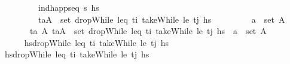\begin{isabellebody}
\ \ \ \ \ \ \ \ \ {\isachardoublequoteopen}ind{\isacharunderscore}{\kern0pt}happ{\isacharunderscore}{\kern0pt}seq\ {\isasympi}s\ hs\isanewline
\ \ \ \ \ \ \ \ \ {\isachardoublequoteopen}{\isacharparenleft}{\kern0pt}t\isactrlsub a{\isacharcomma}{\kern0pt}A{\isacharparenright}{\kern0pt}\ {\isasymin}\ set\ {\isacharparenleft}{\kern0pt}dropWhile\ {\isacharparenleft}{\kern0pt}leq\ t\isactrlsub i{\isacharparenright}{\kern0pt}\ {\isacharparenleft}{\kern0pt}takeWhile\ {\isacharparenleft}{\kern0pt}le\ t\isactrlsub j{\isacharparenright}{\kern0pt}\ hs\isanewline
\ \ \ \ \ \ \ \ \ {\isachardoublequoteopen}a\ {\isasymin}\ set\ A{\isachardoublequoteclose}\isanewline
\ \ \ \ \ \ \ {\isachardoublequoteopen}{\isasymexists}t\isactrlsub a{\isacharprime}{\kern0pt}\ A{\isacharprime}{\kern0pt}{\isachardot}{\kern0pt}\ {\isacharparenleft}{\kern0pt}t\isactrlsub a{\isacharprime}{\kern0pt}{\isacharcomma}{\kern0pt}A{\isacharprime}{\kern0pt}{\isacharparenright}{\kern0pt}\ {\isasymin}\ set\ {\isacharparenleft}{\kern0pt}dropWhile\ {\isacharparenleft}{\kern0pt}leq\ t\isactrlsub i{\isacharparenright}{\kern0pt}\ {\isacharparenleft}{\kern0pt}takeWhile\ {\isacharparenleft}{\kern0pt}le\ t\isactrlsub j{\isacharparenright}{\kern0pt}\ hs\ {\isasymand}\ a\ {\isasymin}\ set\ A{\isacharprime}{\kern0pt}{\isachardoublequoteclose}\isanewline
%
\isadelimproof
\ \ %
\endisadelimproof
%
\isatagproof
{}\isamarkupfalse%
\ {\isacharminus}{\kern0pt}\isanewline
\ \ \ \ \isamarkupfalse%
\ {\isacharquery}{\kern0pt}hsdropWhile\ {\isacharparenleft}{\kern0pt}leq\ t\isactrlsub i{\isacharparenright}{\kern0pt}\ {\isacharparenleft}{\kern0pt}takeWhile\ {\isacharparenleft}{\kern0pt}le\ t\isactrlsub j{\isacharparenright}{\kern0pt}\ hs\isanewline
\ \ \ \ \isamarkupfalse%
\ {\isacharquery}{\kern0pt}hsdropWhile\ {\isacharparenleft}{\kern0pt}leq\ t\isactrlsub i{\isacharparenright}{\kern0pt}\ {\isacharparenleft}{\kern0pt}takeWhile\ {\isacharparenleft}{\kern0pt}le\ t\isactrlsub j{\isacharparenright}{\kern0pt}\ hs\isanewline

\end{isabellebody}
